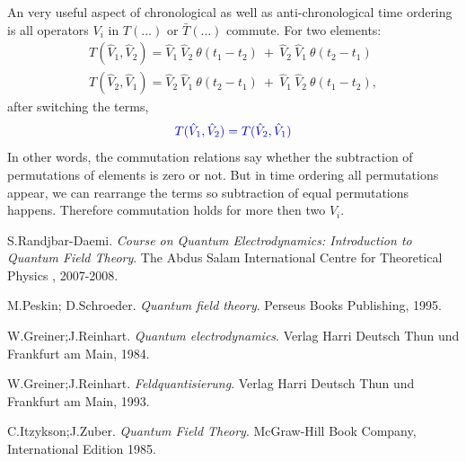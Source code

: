 \documentclass[
11pt, %
english, %
singlespacing, %
headsepline, %
]{MastersDoctoralThesis} %
\begin{document}
\begin{subappendices}
An very useful aspect of chronological as well as anti-chronological time ordering is all operators $ V_i $ in $ T(\ldots) $ or $ \bar{T}(\ldots) $ commute. For two elements:
\begin{subequations}
\begin{align}
T(\hat{V}_1, \hat{V}_2)=\hat{V}_1\ \hat{V}_2\ \theta (t_1 -t_2)\ +\ \hat{V}_2\  \hat{V}_1 \ \theta (t_2-t_1)
\\
T(\hat{V}_2, \hat{V}_1)=\hat{V}_2\ \hat{V}_1\ \theta (t_2 -t_1)\ +\ \hat{V}_1\  \hat{V}_2 \ \theta (t_1-t_2)
,
\end{align}
\end{subequations}
after switching the terms,
\begin{equation}\textcolor[RGB]{0,0,204}{
T(\hat{V}_1, \hat{V}_2)=T(\hat{V}_2, \hat{V}_1)
}
\end{equation}
In other words, the commutation relations say whether the subtraction of permutations of elements is zero or not. But in time ordering all permutations appear, we can rearrange the terms so subtraction of equal permutations happens. Therefore commutation holds for more then two $ V_i $.
\end{subappendices}
\newpage
\begin{thebibliography}{12}
S.Randjbar-Daemi.
\textit{Course on Quantum Electrodynamics: Introduction to Quantum Field Theory}.
 The Abdus Salam International Centre for Theoretical Physics , 2007-2008.
 
M.Peskin; D.Schroeder. 
\textit{Quantum field theory}. 
Perseus Books Publishing, 1995.
 
W.Greiner;J.Reinhart.
\textit{Quantum electrodynamics}.
 Verlag Harri Deutsch Thun und Frankfurt am Main, 1984.
 
W.Greiner;J.Reinhart.
\textit{Feldquantisierung}.
 Verlag Harri Deutsch Thun und Frankfurt am Main, 1993.
 
C.Itzykson;J.Zuber.
\textit{Quantum Field Theory}.
 McGraw-Hill Book Company, International Edition 1985. 
 
\end{thebibliography}



%
%
%



\end{document}
